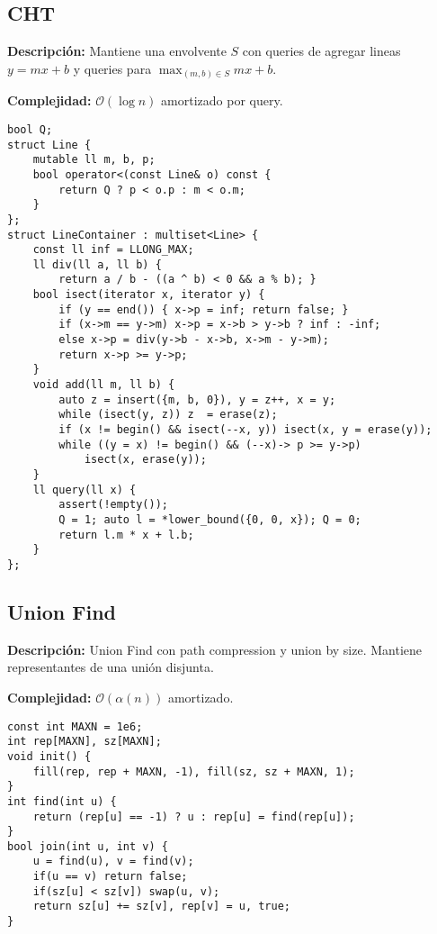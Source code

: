 \documentclass[twocolumn]{article}
\begin{document}
\subsection{CHT}
\begin{footnotesize}{\bf Descripción:} Mantiene una envolvente $S$ con queries de agregar lineas $y = mx + b$ y queries para $\max_{(m, b)\in S} mx + b$.


{\bf Complejidad:} $\mathcal{O}(\log n)$ amortizado por query.
\end{footnotesize}\lstset{basicstyle=\footnotesize\ttfamily,breaklines=true,tabsize=2,language=C++,frame=leftline, numbers=left, numberstyle=\tiny, numbersep=5pt}
\begin{lstlisting}
bool Q;
struct Line {
	mutable ll m, b, p;
	bool operator<(const Line& o) const {
		return Q ? p < o.p : m < o.m;
	}
};
struct LineContainer : multiset<Line> {
	const ll inf = LLONG_MAX;
	ll div(ll a, ll b) {
		return a / b - ((a ^ b) < 0 && a % b); }
	bool isect(iterator x, iterator y) {
		if (y == end()) { x->p = inf; return false; }
		if (x->m == y->m) x->p = x->b > y->b ? inf : -inf;
		else x->p = div(y->b - x->b, x->m - y->m);
		return x->p >= y->p;
	}
	void add(ll m, ll b) {
		auto z = insert({m, b, 0}), y = z++, x = y;
		while (isect(y, z)) z  = erase(z);
		if (x != begin() && isect(--x, y)) isect(x, y = erase(y));
		while ((y = x) != begin() && (--x)-> p >= y->p)
			isect(x, erase(y));
	}
	ll query(ll x) {
		assert(!empty());
		Q = 1; auto l = *lower_bound({0, 0, x}); Q = 0;
		return l.m * x + l.b;
	}
};
\end{lstlisting}
\subsection{Union Find}
\begin{footnotesize}{\bf Descripción:} Union Find con path compression y union by size. Mantiene representantes de una unión disjunta.


{\bf Complejidad:} $\mathcal{O}(\alpha(n))$ amortizado.
\end{footnotesize}\lstset{basicstyle=\footnotesize\ttfamily,breaklines=true,tabsize=2,language=C++,frame=leftline, numbers=left, numberstyle=\tiny, numbersep=5pt}
\begin{lstlisting}
const int MAXN = 1e6;
int rep[MAXN], sz[MAXN];
void init() {
	fill(rep, rep + MAXN, -1), fill(sz, sz + MAXN, 1);
}
int find(int u) {
	return (rep[u] == -1) ? u : rep[u] = find(rep[u]);
}
bool join(int u, int v) {
	u = find(u), v = find(v);
	if(u == v) return false;
	if(sz[u] < sz[v]) swap(u, v);
	return sz[u] += sz[v], rep[v] = u, true;
}
\end{lstlisting}
\end{document}
